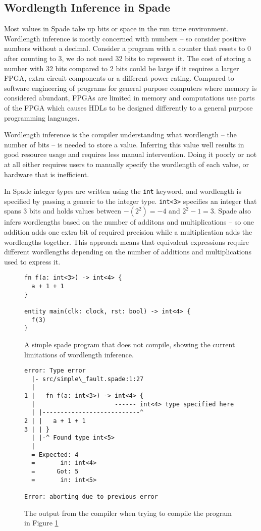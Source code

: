 \subsection{Wordlength Inference in Spade}
\label{sec:TheProblem}
Most values in Spade take up bits or space in the run time environment. Wordlength inference is mostly concerned with numbers -- so consider positive numbers without a decimal. Consider a program with a counter that resets to 0 after counting to 3, we do not need 32 bits to represent it. The cost of storing a number with 32 bits compared to 2 bits could be large if it requires a larger FPGA, extra circuit components or a different power rating. Compared to software engineering of programs for general purpose computers where memory is considered abundant, FPGAs are limited in memory and computations use parts of the FPGA which causes HDLs to be designed differently to a general purpose programming languages.

Wordlength inference is the compiler understanding what wordlength -- the number of bits -- is needed to store a value. Inferring this value well results in  good resource usage and requires less manual intervention. Doing it poorly or not at all either requires users to manually specify the wordlength of each value, or hardware that is inefficient.

In Spade integer types are written using the \verb|int| keyword, and wordlength is specified by passing a generic to the integer type. \verb|int<3>| specifies an integer that spans 3 bits and holds values between $-(2^2) = -4$ and $2^2 - 1 = 3$. Spade also infers wordlengths based on the number of additons and multiplications -- so one addition adds one extra bit of required precision while a multiplication adds the wordlengths together. This approach means that equivalent expressions require different wordlengths depending on the number of additions and multiplications used to express it. 

\begin{figure}
\centering
\begin{verbatim}
fn f(a: int<3>) -> int<4> {
  a + 1 + 1
}

entity main(clk: clock, rst: bool) -> int<4> {
  f(3)
}
\end{verbatim}
\caption{A simple spade program that does not compile, showing the current limitations of wordlength inference.}
\label{figSimpleFaultSpade}
\end{figure}

\begin{figure}
\centering
  \begin{verbatim}
error: Type error
  |- src/simple\_fault.spade:1:27
  |
1 |   fn f(a: int<3>) -> int<4> {
  |                      ------ int<4> type specified here
  | |---------------------------^
2 | |   a + 1 + 1
3 | | }
  | |-^ Found type int<5>
  |
  = Expected: 4
  =       in: int<4>
  =      Got: 5
  =       in: int<5>

Error: aborting due to previous error
\end{verbatim}
\caption{The output from the compiler when trying to compile the program in Figure \ref{figSimpleFaultSpade}}
\label{figSimpleFaultSpadeCompileOutput}
\end{figure}

